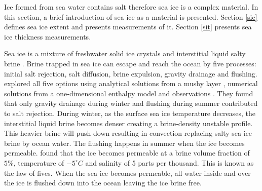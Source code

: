 Ice formed from sea water contains salt therefore sea ice is a complex material. In this section, a brief introduction of sea ice as a material is presented. Section \ref{sie} defines sea ice extent and presents measurements of it. Section \ref{sit} presents sea ice thickness measurements. 

Sea ice is a mixture of freshwater solid ice crystals and interstitial liquid salty brine \citep{porousice}. Brine trapped in sea ice can escape and reach the ocean by five processes: initial salt rejection, salt diffusion, brine expulsion, gravity drainage and flushing. \citet{saltNotz} explored all five options using analytical solutions from a mushy layer \citep{mushy}, numerical solutions from a one-dimensional enthalpy model \citep{1dNotz} and observations \citep{obssalt,thesisNotz}. They found that only gravity drainage during winter and flushing during summer contributed to salt rejection. During winter, as the surface sea ice temperature decreases, the interstitial liquid brine becomes denser creating a brine-density unstable profile. This heavier brine will push down resulting in convection replacing salty sea ice brine by ocean water. The flushing happens in summer when the ice becomes permeable. \citet{rule5} found that the ice becomes permeable at a brine volume fraction of $5\%$, temperature of $-5 ^\circ C$ and salinity of 5 parts per thousand. This is known as the law of fives. When the sea ice becomes permeable, all water inside and over the ice is flushed down into the ocean leaving the ice brine free. 


